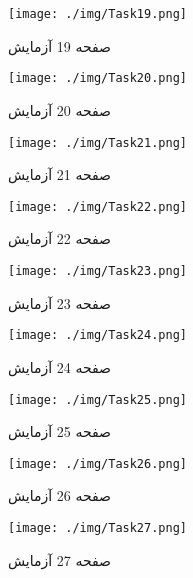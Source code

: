 { 
\begin{figure}[htpb]
\centering
\texttt{[image: ./img/Task19.png]}
\caption{ صفحه 19 آزمایش }
\label{fig:Task19}
\end{figure}
 
 
\begin{figure}[htpb]
\centering
\texttt{[image: ./img/Task20.png]}
\caption{ صفحه 20 آزمایش }
\label{fig:Task20}
\end{figure}
 
 
\begin{figure}[htpb]
\centering
\texttt{[image: ./img/Task21.png]}
\caption{ صفحه 21 آزمایش }
\label{fig:Task21}
\end{figure}
 
 
\begin{figure}[htpb]
\centering
\texttt{[image: ./img/Task22.png]}
\caption{ صفحه 22 آزمایش }
\label{fig:Task22}
\end{figure}
 
 
\begin{figure}[htpb]
\centering
\texttt{[image: ./img/Task23.png]}
\caption{ صفحه 23 آزمایش }
\label{fig:Task23}
\end{figure}
 
 
\begin{figure}[htpb]
\centering
\texttt{[image: ./img/Task24.png]}
\caption{ صفحه 24 آزمایش }
\label{fig:Task24}
\end{figure}
 
 
\begin{figure}[htpb]
\centering
\texttt{[image: ./img/Task25.png]}
\caption{ صفحه 25 آزمایش }
\label{fig:Task25}
\end{figure}
 
 
\begin{figure}[htpb]
\centering
\texttt{[image: ./img/Task26.png]}
\caption{ صفحه 26 آزمایش }
\label{fig:Task26}
\end{figure}
 
 
\begin{figure}[htpb]
\centering
\texttt{[image: ./img/Task27.png]}
\caption{ صفحه 27 آزمایش }
\label{fig:Task27}
\end{figure}
 
}

